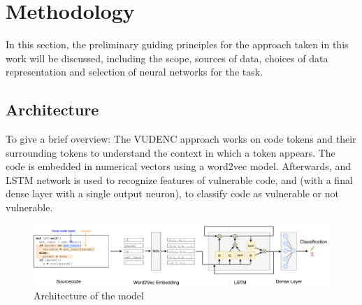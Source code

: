 \documentclass[
a4paper,
pagesize,
pdftex,
12pt,
twoside, %
BCOR=5mm, %
ngerman,
fleqn,
final,
]{scrartcl}
\begin{document}
	
	\newpage
	\section{Methodology}\label{Methodology}
	In this section, the  preliminary guiding principles for the approach taken in this work will be discussed, including the scope, sources of data, choices of data representation and selection of neural networks for the task. 
	
	\subsection{Architecture}
	To give a brief overview: The VUDENC approach works on code tokens and their surrounding tokens to understand the context in which a token appears. The code is embedded in numerical vectors using a word2vec model. Afterwards, and LSTM network is used to recognize features of vulnerable code, and (with a final dense layer with a single output neuron), to classify code as vulnerable or not vulnerable.  
	
	\begin{figure}[ht]
		\centering
		\includegraphics[width=\linewidth]{img/Architecture}
		\caption{Architecture of the model}
		\label{fig:architecture}
	\end{figure}
	
	
\end{document}

